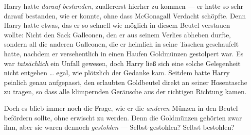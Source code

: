 Harry hatte \emph{darauf bestanden}, zuallererst hierher zu kommen — er hatte so sehr darauf bestanden, wie er konnte, ohne dass McGonagall Verdacht schöpfte. Denn Harry hatte etwas, das er so schnell wie möglich in diesem Beutel verstauen wollte: Nicht den Sack Galleonen, den er aus seinem Verlies abheben durfte, sondern all die anderen Galleonen, die er heimlich in seine Taschen geschaufelt hatte, nachdem er versehentlich in einen Haufen Goldmünzen gestolpert war. Es war \emph{tatsächlich} ein Unfall gewesen, doch Harry ließ sich eine solche Gelegenheit nicht entgehen … egal, wie plötzlich der Gedanke kam. Seitdem hatte Harry peinlich genau aufgepasst, den erlaubten Goldbeutel direkt an seiner Hosentasche zu tragen, so dass alle klimpernden Geräusche aus der richtigen Richtung kamen.

Doch es blieb immer noch die Frage, wie er die \emph{anderen} Münzen in den Beutel befördern sollte, ohne erwischt zu werden. Denn die Goldmünzen gehörten zwar ihm, aber sie waren dennoch \emph{gestohlen} — Selbst-gestohlen? Selbst bestohlen?

